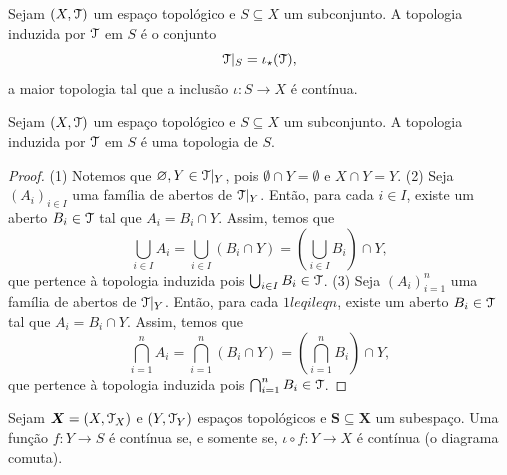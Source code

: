 \begin{prop}
Sejam $(X,\mathcal{T})$ um espaço topológico e $S \subseteq X$ um subconjunto. A topologia induzida por $\mathcal{T}$ em $S$ é o conjunto
	\begin{equation*}
	\mathcal{T}|_S = \iota_\star(\mathcal{T}),
	\end{equation*}
a maior topologia tal que a inclusão $\iota: S \to X$ é contínua.
\end{prop}

\begin{prop}
Sejam $(X,\mathcal{T})$ um espaço topológico e $S \subseteq X$ um subconjunto. A topologia induzida por $\mathcal{T}$ em $S$ é uma topologia de $S$.
\end{prop}
\begin{proof}
(1) Notemos que $\varnothing,Y \in \mathcal{T}|_Y$, pois $\emptyset \cap Y = \emptyset$ e $X \cap Y = Y$. (2) Seja $(A_i)_{i \in I}$ uma família de abertos de $\mathcal{T}|_Y$. Então, para cada $i \in I$, existe um aberto $B_i \in \mathcal{T}$ tal que $A_i = B_i \cap Y$. Assim, temos que
	\begin{equation*}
	\bigcup_{i \in I} A_i = \bigcup_{i \in I} (B_i \cap Y) = \left( \bigcup_{i \in I} B_i \right) \cap Y,
	\end{equation*}
que pertence à topologia induzida pois $\bigcup_{i \in I} B_i \in \mathcal{T}$. (3) Seja $(A_i)_{i=1}^n$ uma família de abertos de $\mathcal{T}|_Y$. Então, para cada $1 leq i leq n$, existe um aberto $B_i \in \mathcal{T}$ tal que $A_i = B_i \cap Y$. Assim, temos que
	\begin{equation*}
	\bigcap_{i=1}^n A_i = \bigcap_{i=1}^n (B_i \cap Y) = \left( \bigcap_{i=1}^n B_i \right) \cap Y,
	\end{equation*}
que pertence à topologia induzida pois $\bigcap_{i=1}^n B_i \in \mathcal{T}$.
\end{proof}

\begin{prop}
Sejam $\bm X=(X,\mathcal{T}_X)$ e $(Y,\mathcal{T}_Y)$ espaços topológicos e $\bm S \subseteq \bm X$ um subespaço. Uma função $f: Y \to S$ é contínua se, e somente se, $\iota \circ f: Y \to X$ é contínua (o diagrama comuta).
\begin{figure}
\centering
{}
\end{figure}
\end{prop}

